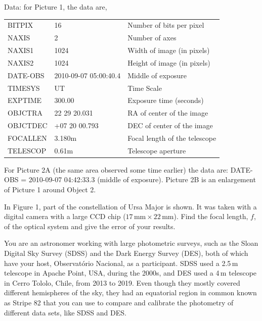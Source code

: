 Data: for Picture 1, the data are,

\begin{center}
\begin{tabular}{lll}
BITPIX & 16 & Number of bits per pixel \\
NAXIS & 2 & Number of axes \\
NAXIS1 & 1024 & Width of image (in pixels) \\
NAXIS2 & 1024 & Height of image (in pixels) \\
DATE-OBS & 2010-09-07 05:00:40.4 & Middle of exposure \\
TIMESYS & UT & Time Scale \\
EXPTIME & 300.00 & Exposure time (seconds) \\
OBJCTRA & 22 29 20.031 & RA of center of the image \\
OBJCTDEC & +07 20 00.793 & DEC of center of the image \\
FOCALLEN & 3.180m & Focal length of the telescope \\
TELESCOP & 0.61m & Telescope aperture \\
\end{tabular}
\end{center}


For Picture 2A (the same area observed some time earlier) the data are:
DATE-OBS = 2010-09-07 04:42:33.3 (middle of exposure). Picture 2B is an
enlargement of Picture 1 around Object 2.



In Figure 1, part of the constellation of Ursa Major is shown. It was taken
with a digital camera with a large CCD chip
($17\,\mathrm{mm} \times 22\,\mathrm{mm}$). Find the focal length, $f$, of
the optical system and give the error of your results.

You are an astronomer working with large photometric surveys, such as the
Sloan Digital Sky Survey (SDSS) and the Dark Energy Survey (DES), both of
which have your host, Observat\'orio Nacional, as a participant. SDSS used a
2.5\,m telescope in Apache Point, USA, during the 2000s, and DES used a 4\,m
telescope in Cerro Tololo, Chile, from 2013 to 2019. Even though they mostly
covered different hemispheres of the sky, they had an equatorial region in
common known as Stripe 82 that you can use to compare and calibrate the
photometry of different data sets, like SDSS and DES.

